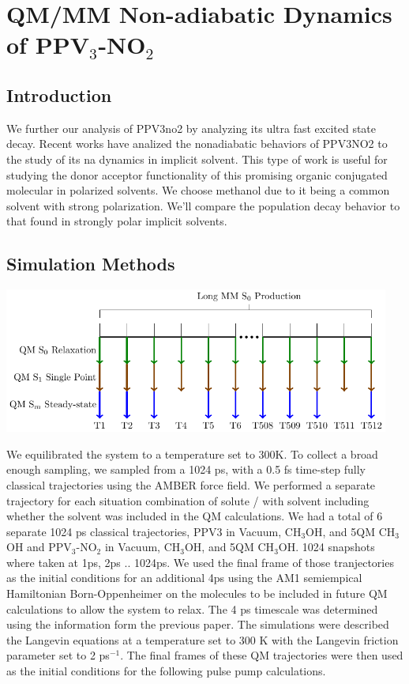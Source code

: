 \chapter{QM/MM Non-adiabatic Dynamics of PPV\(_3\)-NO\(_2\)}

\section{Introduction}
We further our analysis of PPV3no2 by analyzing its ultra fast excited state decay.
Recent works have analized the nonadiabatic behaviors of PPV3NO2  to the study of its na dynamics in implicit solvent. \cite{sifain2018photoexcited,dykstra2009conformational}
This type of work is useful for studying the donor acceptor functionality of this promising organic conjugated molecular in polarized solvents.
We choose methanol due to it being a common solvent with strong polarization.
We'll compare the population decay behavior to that found in strongly polar implicit solvents.

\section{Simulation Methods}

\noindent
\begin{minipage}[c]{\textwidth}
  \centering
  \includegraphics[width=5in]{../Paper2/scripted_diagrams/simulations-1.png}
  \label{fig:nonadiabaticSimulation}
\end{minipage}\bigskip

We equilibrated the system to a temperature set to 300K. To collect a broad
enough sampling, we sampled from a 1024 ps, with a 0.5 fs time-step fully
classical trajectories using the AMBER force field. We performed a separate
trajectory for each situation combination of solute / with solvent including
whether the solvent was included in the QM calculations. We had a total of 6
separate 1024 ps classical trajectories, PPV3 in Vacuum, CH\(_3\)OH, and 5QM CH\(_3\)OH
and PPV\(_3\)-NO\(_2\) in Vacuum, CH\(_3\)OH, and 5QM CH\(_3\)OH. 1024 snapshots where taken at
1ps, 2ps .. 1024ps. We used the final frame of those tranjectories as the
initial conditions for an additional 4ps using the AM1 semiempical Hamiltonian
Born-Oppenheimer on the molecules to be included in future QM calculations to
allow the system to relax. The 4 ps timescale was determined using the
information form the previous paper. The simulations were described the Langevin
equations at a temperature set to 300 K with the Langevin friction parameter set
to 2 ps\(^{-1}\). The final frames of these QM trajectories were then used as the
initial conditions for the following pulse pump calculations.

